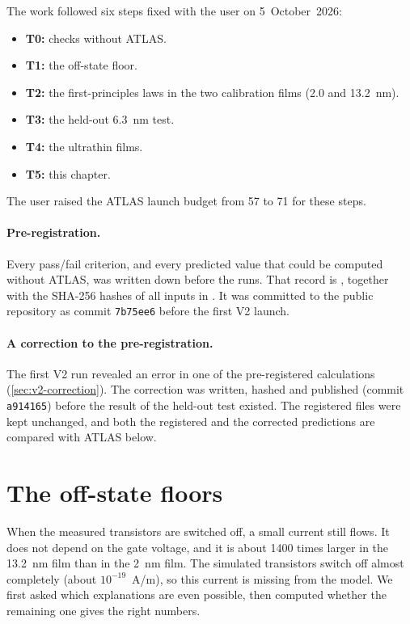 The work followed six steps fixed with the user on 5~October~2026:
\begin{itemize}
\item \textbf{T0:} checks without ATLAS.
\item \textbf{T1:} the off-state floor.
\item \textbf{T2:} the first-principles laws in the two calibration films (2.0 and 13.2~nm).
\item \textbf{T3:} the held-out 6.3~nm test.
\item \textbf{T4:} the ultrathin films.
\item \textbf{T5:} this chapter.
\end{itemize}
The user raised the ATLAS launch budget from 57 to 71 for these steps.

\paragraph{Pre-registration.} Every pass/fail criterion, and every predicted value that could be computed without
ATLAS, was written down before the runs. That record is , together with
the SHA-256 hashes of all inputs in . It was committed to the public repository as commit
\texttt{7b75ee6} before the first V2 launch.

\paragraph{A correction to the pre-registration.} The first V2 run revealed an error in one of the pre-registered
calculations (\cref{sec:v2-correction}). The correction was written, hashed and published (commit \texttt{a914165})
before the result of the held-out test existed. The registered files were kept unchanged, and both the registered and
the corrected predictions are compared with ATLAS below.

\section{The off-state floors}
\label{sec:v2-floor}

\begin{v2plain}
When the measured transistors are switched off, a small current still flows. It does not depend on the gate voltage,
and it is about 1400 times larger in the 13.2~nm film than in the 2~nm film. The simulated transistors switch off
almost completely (about $10^{-19}$~A/\textmu m), so this current is missing from the model. We first asked which
explanations are even possible, then computed whether the remaining one gives the right numbers.
\end{v2plain}

